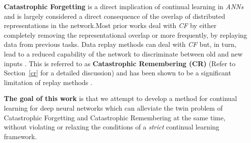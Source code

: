 \documentclass{article}
\begin{document}
\textbf{Catastrophic Forgetting} is a direct implication of continual learning in \textit{ANNs} and is largely considered a direct consequence of the overlap of distributed representations in the network.Most prior works deal with \textit{CF} by either completely removing the representational overlap \cite{French1991, kirkpatrick2017overcoming} or more frequently, 
by replaying data from previous tasks.
Data replay methods can deal with \textit{CF} but, in turn, lead to a reduced capability of the network to 
discriminate between old and new inputs \cite{doi:10.1080/09540099550039264}. This is referred to as \textbf{Catastrophic Remembering (CR)} (Refer to Section~\ref{cr} for a detailed discussion) and 
has been shown to be a significant limitation of replay methods \cite{robins_catastrophic_1993,doi:10.1080/09540099550039264}.


\textbf{The goal of this work} is that we attempt to develop a method for continual learning for deep neural networks which can alleviate the twin problem of Catastrophic Forgetting and Catastrophic Remembering at the same time, without violating or relaxing the conditions of a \textit{strict} continual learning framework.
\end{document}
